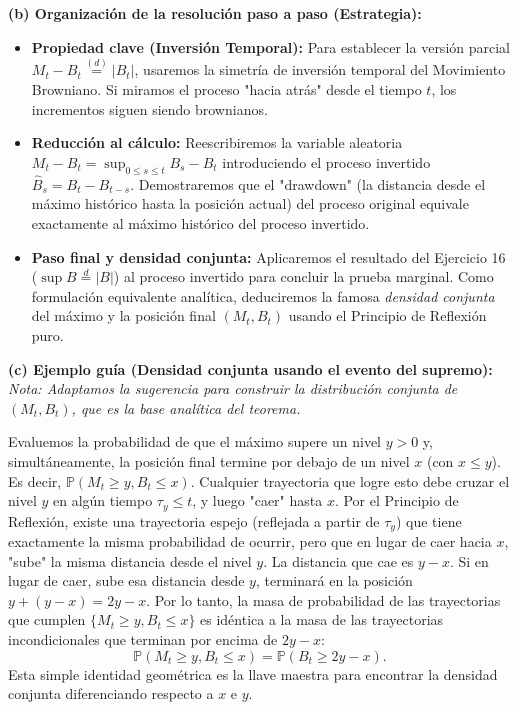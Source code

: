\documentclass[11pt, letterpaper]{article}
\begin{document}
\begin{solucion}
    \textbf{(b) Organización de la resolución paso a paso (Estrategia):}
    \begin{itemize}
        \item[(i)] \textbf{Propiedad clave (Inversión Temporal):} Para establecer la versión parcial $M_t - B_t \stackrel{(d)}{=} |B_t|$, usaremos la simetría de inversión temporal del Movimiento Browniano. Si miramos el proceso "hacia atrás" desde el tiempo $t$, los incrementos siguen siendo brownianos.
        \item[(ii)] \textbf{Reducción al cálculo:} Reescribiremos la variable aleatoria $M_t - B_t = \sup_{0 \le s \le t} B_s - B_t$ introduciendo el proceso invertido $\hat{B}_s = B_{t} - B_{t-s}$. Demostraremos que el "drawdown" (la distancia desde el máximo histórico hasta la posición actual) del proceso original equivale exactamente al máximo histórico del proceso invertido.
        \item[(iii)] \textbf{Paso final y densidad conjunta:} Aplicaremos el resultado del Ejercicio 16 ($\sup B \stackrel{d}{=} |B|$) al proceso invertido para concluir la prueba marginal. Como formulación equivalente analítica, deduciremos la famosa \textit{densidad conjunta} del máximo y la posición final $(M_t, B_t)$ usando el Principio de Reflexión puro.
    \end{itemize}

    \vspace{3mm}
    \textbf{(c) Ejemplo guía (Densidad conjunta usando el evento del supremo):}
    \textit{Nota: Adaptamos la sugerencia para construir la distribución conjunta de $(M_t, B_t)$, que es la base analítica del teorema.}
    
    Evaluemos la probabilidad de que el máximo supere un nivel $y > 0$ y, simultáneamente, la posición final termine por debajo de un nivel $x$ (con $x \le y$). Es decir, $\mathbb{P}(M_t \ge y, B_t \le x)$.
    Cualquier trayectoria que logre esto debe cruzar el nivel $y$ en algún tiempo $\tau_y \le t$, y luego "caer" hasta $x$.
    Por el Principio de Reflexión, existe una trayectoria espejo (reflejada a partir de $\tau_y$) que tiene exactamente la misma probabilidad de ocurrir, pero que en lugar de caer hacia $x$, "sube" la misma distancia desde el nivel $y$.
    La distancia que cae es $y - x$. Si en lugar de caer, sube esa distancia desde $y$, terminará en la posición $y + (y - x) = 2y - x$.
    Por lo tanto, la masa de probabilidad de las trayectorias que cumplen $\{M_t \ge y, B_t \le x\}$ es idéntica a la masa de las trayectorias incondicionales que terminan por encima de $2y - x$:
    \[ \mathbb{P}(M_t \ge y, B_t \le x) = \mathbb{P}(B_t \ge 2y - x). \]
    Esta simple identidad geométrica es la llave maestra para encontrar la densidad conjunta diferenciando respecto a $x$ e $y$.


\end{solucion}
\end{document}
